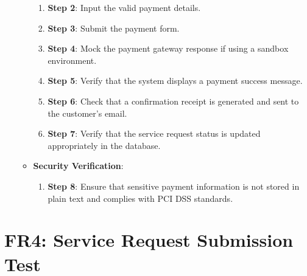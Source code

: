 \documentclass[12pt, titlepage]{article}
\begin{document}
\begin{enumerate}
\begin{itemize}
\begin{enumerate}
            \item \textbf{Step 2}: Input the valid payment details.
            \item \textbf{Step 3}: Submit the payment form.
            \item \textbf{Step 4}: Mock the payment gateway response if using a sandbox environment.
            \item \textbf{Step 5}: Verify that the system displays a payment success message.
            \item \textbf{Step 6}: Check that a confirmation receipt is generated and sent to the customer's email.
            \item \textbf{Step 7}: Verify that the service request status is updated appropriately in the database.
        \end{enumerate}
        \item \textbf{Security Verification}:
        \begin{enumerate}
            \item \textbf{Step 8}: Ensure that sensitive payment information is not stored in plain text and complies with PCI DSS standards.
        \end{enumerate}
    \end{itemize}
\end{enumerate}

\section*{FR4: Service Request Submission Test}
\end{document}
